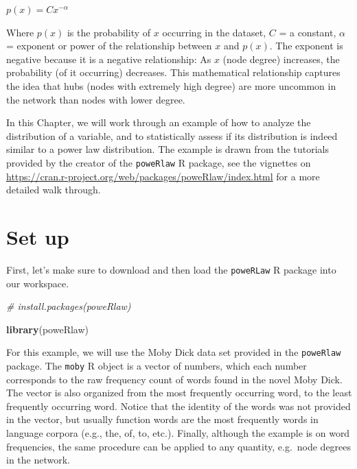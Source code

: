 \documentclass[
]{book}
\newenvironment{Shaded}{\begin{snugshade}}{\end{snugshade}}
\newcommand{\CommentTok}[1]{\textcolor[rgb]{0.56,0.35,0.01}{\textit{#1}}}
\newcommand{\FunctionTok}[1]{\textcolor[rgb]{0.13,0.29,0.53}{\textbf{#1}}}
\newcommand{\NormalTok}[1]{#1}
\newcommand{\StringTok}[1]{\textcolor[rgb]{0.31,0.60,0.02}{#1}}
\begin{document}
\(p(x) = Cx^{-\alpha}\)

Where \(p(x)\) is the probability of \(x\) occurring in the dataset, \(C\) = a constant, \(\alpha\) = exponent or power of the relationship between \(x\) and \(p(x)\). The exponent is negative because it is a negative relationship: As \(x\) (node degree) increases, the probability (of it occurring) decreases. This mathematical relationship captures the idea that hubs (nodes with extremely high degree) are more uncommon in the network than nodes with lower degree.

In this Chapter, we will work through an example of how to analyze the distribution of a variable, and to statistically assess if its distribution is indeed similar to a power law distribution. The example is drawn from the tutorials provided by the creator of the \texttt{poweRlaw} R package, see the vignettes on \url{https://cran.r-project.org/web/packages/poweRlaw/index.html} for a more detailed walk through.

\section{Set up}\label{set-up-4}

First, let's make sure to download and then load the \texttt{poweRLaw} R package into our workspace.

\begin{Shaded}
\begin{Highlighting}[]
\CommentTok{\# install.packages(\textquotesingle{}poweRlaw\textquotesingle{})}

\FunctionTok{library}\NormalTok{(}\StringTok{\textquotesingle{}poweRlaw\textquotesingle{}}\NormalTok{)}
\end{Highlighting}
\end{Shaded}

For this example, we will use the Moby Dick data set provided in the \texttt{poweRlaw} package. The \texttt{moby} R object is a vector of numbers, which each number corresponds to the raw frequency count of words found in the novel Moby Dick. The vector is also organized from the most frequently occurring word, to the least frequently occurring word. Notice that the identity of the words was not provided in the vector, but usually function words are the most frequently words in language corpora (e.g., the, of, to, etc.). Finally, although the example is on word frequencies, the same procedure can be applied to any quantity, e.g.~node degrees in the network.
\end{document}
